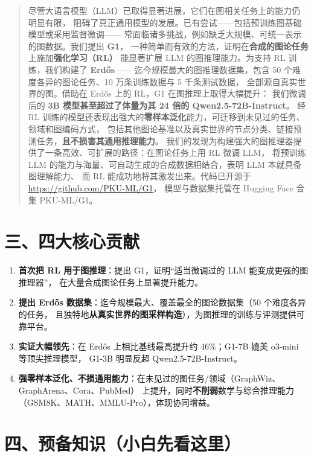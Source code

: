 \documentclass[11pt,UTF8,fontset=fandol]{ctexart}
\begin{document}
\begin{quote}
尽管大语言模型（LLM）已取得显著进展，它们在图相关任务上的能力仍明显有限，
阻碍了真正通用模型的发展。已有尝试——包括预训练图基础模型或采用监督微调——
常面临诸多挑战，例如缺乏大规模、可统一表示的图数据。我们提出 \textbf{G1}，
一种简单而有效的方法，证明在\textbf{合成的图论任务}上施加\textbf{强化学习（RL）}
能显著扩展 LLM 的图推理能力。为支持 RL 训练，我们构建了 \textbf{Erdős}——
迄今规模最大的图推理数据集，包含 50 个难度各异的图论任务、10 万条训练数据与 5 千条测试数据，
全部源自真实世界的图。借助在 Erdős 上的 RL，G1 在图推理上取得大幅提升：
我们微调后的 \textbf{3B 模型甚至超过了体量为其 24 倍的 Qwen2.5-72B-Instruct}。
经 RL 训练的模型还表现出强大的\textbf{零样本泛化}能力，可迁移到未见过的任务、领域和图编码方式，
包括其他图论基准以及真实世界的节点分类、链接预测任务，\textbf{且不损害其通用推理能力}。
我们的发现为构建强大的图推理器提供了一条高效、可扩展的路径：在图论任务上用 RL 微调 LLM，
将预训练 LLM 的能力与海量、可自动生成的合成数据相结合，表明 LLM 本就具备图理解能力、
而 RL 能成功地将其激发出来。代码已开源于 \url{https://github.com/PKU-ML/G1}，
模型与数据集托管在 Hugging Face 合集 PKU-ML/G1。
\end{quote}

\section{三、四大核心贡献}
\begin{enumerate}[leftmargin=2em]
  \item \textbf{首次把 RL 用于图推理}：提出 G1，证明“适当微调过的 LLM 能变成更强的图推理器”，
        在大量合成图论任务上显著提升能力。
  \item \textbf{提出 Erdős 数据集}：迄今规模最大、覆盖最全的图论数据集（50 个难度各异的任务，
        且独特地\textbf{从真实世界的图采样构造}），为图推理的训练与评测提供可靠平台。
  \item \textbf{实证大幅领先}：在 Erdős 上相比基线最高提升约 46\%；G1-7B 媲美 o3-mini 等顶尖推理模型，
        G1-3B 明显反超 Qwen2.5-72B-Instruct。
  \item \textbf{强零样本泛化、不损通用能力}：在未见过的图任务/领域（GraphWiz、GraphArena、Cora、PubMed）
        上提升，同时\textbf{不削弱}数学与综合推理能力（GSM8K、MATH、MMLU-Pro），体现协同增益。
\end{enumerate}

\section{四、预备知识（小白先看这里）}
\end{document}
